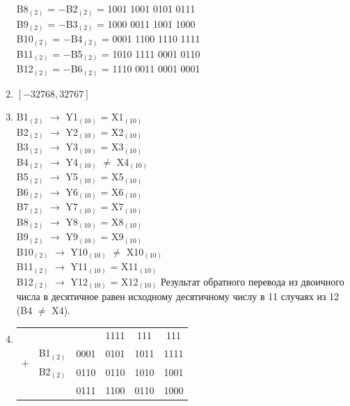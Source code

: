 \documentclass[11pt]{article}
\begin{document}
\begin{paracol}{2}
\begin{enumerate}
		B8$_{(2)}$\phantom{0} = $-$B2$_{(2)}$ = 1001 1001 0101 0111\\
		B9$_{(2)}$ \phantom{0}= $-$B3$_{(2)}$ = 1000 0011 1001 1000\\
		B10$_{(2)}$ = $-$B4$_{(2)}$ = 0001 1100 1110 1111\\
		B11$_{(2)}$ = $-$B5$_{(2)}$ = 1010 1111 0001 0110\\
		B12$_{(2)}$ = $-$B6$_{(2)}$ = 1110 0011 0001 0001
	\item $[-32768,32767]$
	\item 
		B1$_{(2)}$\phantom{0} $\rightarrow$ Y1$_{(10)}$\phantom{0} = X1$_{(10)}$\\
		B2$_{(2)}$\phantom{0} $\rightarrow$ Y2$_{(10)}$\phantom{0} = X2$_{(10)}$\\
		B3$_{(2)}$\phantom{0} $\rightarrow$ Y3$_{(10)}$\phantom{0} = X3$_{(10)}$\\
		B4$_{(2)}$\phantom{0} $\rightarrow$ Y4$_{(10)}$\phantom{0} $\neq$ X4$_{(10)}$\\
		B5$_{(2)}$\phantom{0} $\rightarrow$ Y5$_{(10)}$\phantom{0} = X5$_{(10)}$\\
		B6$_{(2)}$\phantom{0} $\rightarrow$ Y6$_{(10)}$\phantom{0} = X6$_{(10)}$\\
		B7$_{(2)}$\phantom{0} $\rightarrow$ Y7$_{(10)}$\phantom{0} = X7$_{(10)}$\\
		B8$_{(2)}$\phantom{0} $\rightarrow$ Y8$_{(10)}$\phantom{0} = X8$_{(10)}$\\
		B9$_{(2)}$\phantom{0} $\rightarrow$ Y9$_{(10)}$\phantom{0} = X9$_{(10)}$\\
		B10$_{(2)}$ $\rightarrow$ Y10$_{(10)}$ $\neq$ X10$_{(10)}$\\
		B11$_{(2)}$ $\rightarrow$ Y11$_{(10)}$ = X11$_{(10)}$\\
		B12$_{(2)}$ $\rightarrow$ Y12$_{(10)}$ = X12$_{(10)}$
	\switchcolumn
	\setcounter{enumi}{7}
		Результат обратного перевода из двоичного числа в десятичное равен исходному десятичному числу
		в 11 случаях из 12 (B4 $\neq$ X4).\\
	\item 
		\begin{tabular}[t]{cccccc}
			&       &                                                & 1111   & \phantom{1}111 &111\phantom{1}\\
			\multirow{2}{*}{$+$} & B1$_{(2)}$ & 0001 & 0101 & 1011 & 1111\\
						          & B2$_{(2)}$ & 0110 & 0110 & 1010 &  1001\\
			\cline{2-6}
						       &        & 0111 & 1100 & 0110 & 1000\\

\end{tabular}
\end{enumerate}
\end{paracol}
\end{document}
